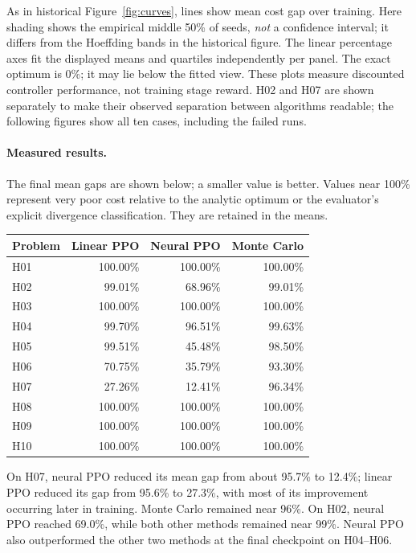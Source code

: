 \documentclass[11pt]{article}
\begin{document}
As in historical Figure~\ref{fig:curves}, lines show mean cost gap over training.
Here shading shows the empirical middle 50\% of seeds, \emph{not} a confidence
interval; it differs from the Hoeffding bands in the historical figure.
The linear percentage axes fit the displayed means and quartiles independently per panel.
The exact optimum is 0\%; it may lie below the fitted view. These plots measure discounted
controller performance, not training stage reward. H02 and H07 are shown separately to make
their observed separation between algorithms readable; the following figures show
all ten cases, including the failed runs.

\paragraph{Measured results.}
The final mean gaps are shown below; a smaller value is better. Values near 100\%
represent very poor cost relative to the analytic optimum or the evaluator's
explicit divergence classification. They are retained in the means.
\begin{center}
\begin{tabular}{@{}lrrr@{}}
\toprule
Problem & Linear PPO & Neural PPO & Monte Carlo \\
\midrule
H01 & 100.00\% & 100.00\% & 100.00\% \\
H02 & 99.01\% & 68.96\% & 99.01\% \\
H03 & 100.00\% & 100.00\% & 100.00\% \\
H04 & 99.70\% & 96.51\% & 99.63\% \\
H05 & 99.51\% & 45.48\% & 98.50\% \\
H06 & 70.75\% & 35.79\% & 93.30\% \\
H07 & 27.26\% & 12.41\% & 96.34\% \\
H08 & 100.00\% & 100.00\% & 100.00\% \\
H09 & 100.00\% & 100.00\% & 100.00\% \\
H10 & 100.00\% & 100.00\% & 100.00\% \\
\bottomrule
\end{tabular}
\end{center}
On H07, neural PPO reduced its mean gap from about 95.7\% to 12.4\%; linear
PPO reduced its gap from 95.6\% to 27.3\%, with most of its improvement occurring
later in training. Monte Carlo remained near 96\%. On H02, neural PPO reached
69.0\%, while both other methods remained near 99\%. Neural PPO also outperformed
the other two methods at the final checkpoint on H04--H06.
\end{document}
